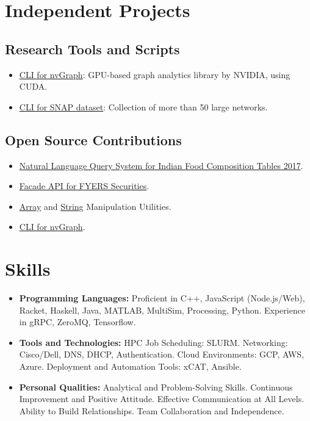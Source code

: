 \documentclass[a4paper,10pt]{article}
\begin{document}
\section*{Independent Projects}
\subsection*{Research Tools and Scripts}
\begin{itemize}[noitemsep, leftmargin=*]
  \item \href{https://github.com/nodef/nvgraph.sh}{CLI for nvGraph}: GPU-based graph analytics library by NVIDIA, using CUDA.
  \item \href{https://github.com/nodef/snap-data.sh}{CLI for SNAP dataset}: Collection of more than 50 large networks.
\end{itemize}

\subsection*{Open Source Contributions}
\begin{itemize}[noitemsep, leftmargin=*]
  \item \href{https://ifct2017.github.io}{Natural Language Query System for Indian Food Composition Tables 2017}.
  \item \href{https://github.com/nodef/extra-fyers}{Facade API for FYERS Securities}.
  \item \href{https://github.com/nodef/extra-array}{Array} and \href{https://github.com/nodef/extra-string}{String} Manipulation Utilities.
  \item \href{https://github.com/nodef/nvgraph.sh}{CLI for nvGraph}.
\end{itemize}

\section*{Skills}
\begin{itemize}[noitemsep, leftmargin=*]
  \item \textbf{Programming Languages:} Proficient in C++, JavaScript (Node.js/Web), Racket, Haskell, Java, MATLAB, MultiSim, Processing, Python. Experience in gRPC, ZeroMQ, Tensorflow.
  \item \textbf{Tools and Technologies:} HPC Job Scheduling: SLURM. Networking: Cisco/Dell, DNS, DHCP, Authentication. Cloud Environments: GCP, AWS, Azure. Deployment and Automation Tools: xCAT, Ansible.
  \item \textbf{Personal Qualities:} Analytical and Problem-Solving Skills. Continuous Improvement and Positive Attitude. Effective Communication at All Levels. Ability to Build Relationships. Team Collaboration and Independence.
\end{itemize}
\end{document}

